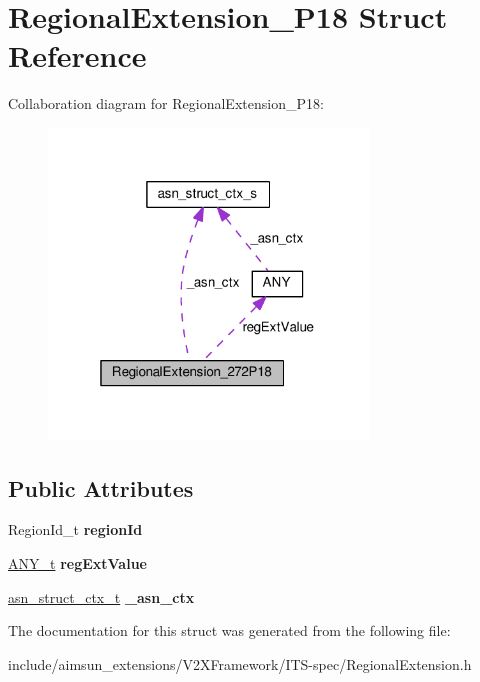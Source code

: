 \hypertarget{structRegionalExtension__272P18}{}\section{Regional\+Extension\+\_\+P18 Struct Reference}
\label{structRegionalExtension__272P18}


Collaboration diagram for Regional\+Extension\+\_\+P18\+:\nopagebreak
\begin{figure}[H]
\begin{center}
\leavevmode
\includegraphics[width=241pt]{structRegionalExtension__272P18__coll__graph}
\end{center}
\end{figure}
\subsection*{Public Attributes}
\begin{DoxyCompactItemize}
\item 
Region\+Id\+\_\+t {\bfseries region\+Id}\hypertarget{structRegionalExtension__272P18_a56592869d452c609d9fb3ada620bc4ae}{}\label{structRegionalExtension__272P18_a56592869d452c609d9fb3ada620bc4ae}

\item 
\hyperlink{structANY}{A\+N\+Y\+\_\+t} {\bfseries reg\+Ext\+Value}\hypertarget{structRegionalExtension__272P18_a93ed0adb864f816aa862aeadf22c97f2}{}\label{structRegionalExtension__272P18_a93ed0adb864f816aa862aeadf22c97f2}

\item 
\hyperlink{structasn__struct__ctx__s}{asn\+\_\+struct\+\_\+ctx\+\_\+t} {\bfseries \+\_\+asn\+\_\+ctx}\hypertarget{structRegionalExtension__272P18_a8d5f3be45d5e45a5509f8293277388aa}{}\label{structRegionalExtension__272P18_a8d5f3be45d5e45a5509f8293277388aa}

\end{DoxyCompactItemize}


The documentation for this struct was generated from the following file\+:\begin{DoxyCompactItemize}
\item 
include/aimsun\+\_\+extensions/\+V2\+X\+Framework/\+I\+T\+S-\/spec/Regional\+Extension.\+h\end{DoxyCompactItemize}
